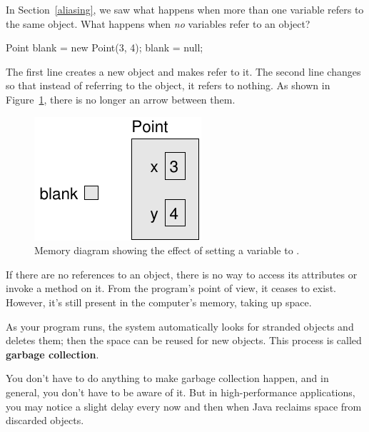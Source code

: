 
In Section~\ref{aliasing}, we saw what happens when more than one variable refers to the same object.
What happens when {\em no} variables refer to an object?

\begin{code}
Point blank = new Point(3, 4);
blank = null;
\end{code}

The first line creates a new  object and makes  refer to it.
The second line changes  so that instead of referring to the object, it refers to nothing.
As shown in Figure~\ref{fig.reference3}, there is no longer an arrow between them.

\begin{figure}[!ht]
\begin{center}
\includegraphics{figs/reference3.pdf}
\caption{Memory diagram showing the effect of setting a variable to .}
\label{fig.reference3}
\end{center}
\end{figure}

If there are no references to an object, there is no way to access its attributes or invoke a method on it.
From the program's point of view, it ceases to exist.
However, it's still present in the computer's memory, taking up space.


As your program runs, the system automatically looks for stranded objects and deletes them; then the space can be reused for new objects.
This process is called {\bf garbage collection}.

You don't have to do anything to make garbage collection happen, and in general, you don't have to be aware of it.
But in high-performance applications, you may notice a slight delay every now and then when Java reclaims space from discarded objects.


